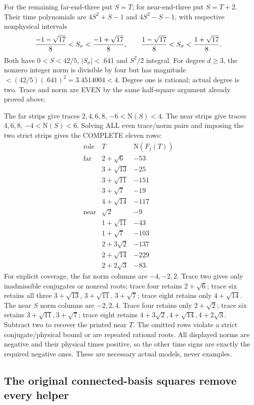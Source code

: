 For the remaining far-end-three put \(S=T\);
for near-end-three put \(S=T+2\).
Their time polynomials are \(4S^2+S-1\) and
\(4S^2-S-1\), with respective nonphysical intervals
\[
 { -1-\sqrt{17}\over8}<S_\sigma<{ -1+\sqrt{17}\over8},
 \qquad
 {1-\sqrt{17}\over8}<S_\sigma<{1+\sqrt{17}\over8}.
\]
Both have \(0<S<42/5\), \(|S_\sigma|<.641\)
and \(S^2/2\) integral.
For degree \(d\ge3\), the nonzero integer norm
is divisible by four but has magnitude
\(<(42/5)(.641)^2=3.4514004<4\).
Degree one is rational; actual degree is two.
Trace and norm are EVEN by the same half-square
argument already proved above.

The far strips give traces \(2,4,6,8\),
\(-6<\mathrm N(S)<4\).
The near strips give traces \(4,6,8\),
\(-4<\mathrm N(S)<6\).
Solving ALL even trace/norm pairs and imposing
the two strict strips gives the COMPLETE eleven rows:
\[
\begin{array}{c|c|r}
 \text{role}&T&\mathrm N(F_j(T))\\ \hline
 \text{far}&2+\sqrt6&-53\\
 &3+\sqrt{13}&-25\\
 &3+\sqrt{11}&-151\\
 &3+\sqrt7&-19\\
 &4+\sqrt{14}&-117\\ \hline
 \text{near}&\sqrt2&-9\\
 &1+\sqrt{11}&-43\\
 &1+\sqrt7&-103\\
 &2+3\sqrt2&-137\\
 &2+\sqrt{14}&-229\\
 &2+2\sqrt3&-83 .
\end{array}
\]
For explicit coverage, the far norm columns are
\(-4,-2,2\).
Trace two gives only inadmissible conjugates or
nonreal roots; trace four retains \(2+\sqrt6\);
trace six retains all three \(3+\sqrt{13}\),
\(3+\sqrt{11}\), \(3+\sqrt7\);
trace eight retains only \(4+\sqrt{14}\).
The near \(S\) norm columns are \(-2,2,4\).
Trace four retains only \(2+\sqrt2\);
trace six retains \(3+\sqrt{11},3+\sqrt7\);
trace eight retains \(4+3\sqrt2,4+\sqrt{14},4+2\sqrt3\).
Subtract two to recover the printed near \(T\).
The omitted rows violate a strict conjugate/physical
bound or are repeated rational roots.
All displayed norms are negative and their physical
times positive, so the other time signs are exactly
the required negative ones.
These are necessary actual models, never examples.

\subsection{The original connected-basis squares remove every helper}
\label{app:arithB16helpersquares}

